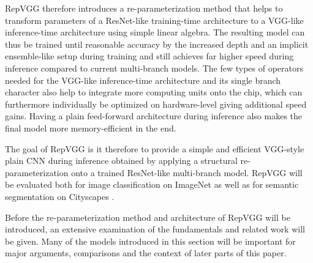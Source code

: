 RepVGG therefore introduces a re-parameterization method that helps to transform parameters of a ResNet-like training-time architecture to a VGG-like inference-time architecture using simple linear algebra. The resulting model can thus be trained until reasonable accuracy by the increased depth and an implicit ensemble-like setup during training and still achieves far higher speed during inference compared to current multi-branch models. The few types of operators needed for the VGG-like inference-time architecture and its single branch character also help to integrate more computing units onto the chip, which can furthermore individually be optimized on hardware-level giving additional speed gains. Having a plain feed-forward architecture during inference also makes the final model more memory-efficient in the end. 

The goal of RepVGG is it therefore to provide a simple and efficient VGG-style plain CNN during inference obtained by applying a structural re-parameterization onto a trained ResNet-like multi-branch model. RepVGG will be evaluated both for image classification on ImageNet \cite{JiaDeng.2009} as well as for semantic segmentation on Cityscapes \cite{MariusCordts.2016}. 

Before the re-parameterization method and architecture of RepVGG will be introduced, an extensive examination of the fundamentals and related work will be given. Many of the models introduced in this section will be important for major arguments, comparisons and the context of later parts of this paper. 